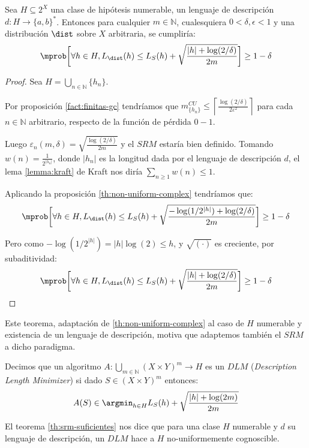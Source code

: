 \begin{fact}
 Sea $H \subseteq 2^X$ una clase de hipótesis numerable, un lenguaje de descripción $d:H \rightarrow \{a,b\}^{\ast}$. Entonces
 para cualquier $m\in \mathbb{N}$, cualesquiera $0 < \delta, \epsilon < 1$ y una distribución $\dist$ sobre $X$ arbitraria, 
 se cumpliría:
 \[
   \mprob\bigg[\forall h\in H, L_{\dist}(h) \le L_S(h) + \sqrt{\frac{|h| + \log(2/\delta)}{2m}} \bigg] \ge 1 - \delta
 \] 
 \label{fact:occam}
\end{fact}
\begin{proof}
 Sea $H = \bigcup_{n\in \mathbb{N}} \{h_n\}$. 
 
 Por proposición \ref{fact:finitas-gc} tendríamos que $m^{CU}_{\{h_n\}} \le \left\lceil \frac{\log(2/\delta)}{2\varepsilon^2} \right\rceil$
 para cada $n\in \mathbb{N}$ arbitrario, respecto de la función de pérdida $0-1$.
 
 Luego $\varepsilon_n(m,\delta) = \sqrt{\frac{\log(2/\delta)}{2m}}$ y el $SRM$ estaría bien definido. Tomando $w(n) = \frac{1}{2^{|h_n|}}$, donde
 $|h_n|$ es la longitud dada por el lenguaje de descripción $d$, el lema \ref{lemma:kraft} de Kraft nos diría 
 $\sum_{n \ge 1} w(n) \le 1$.
 
 Aplicando la proposición \ref{th:non-uniform-complex} tendríamos que:
 \[
   \mprob\bigg[\forall h\in H, L_{\dist}(h) \le L_S(h) + \sqrt{\frac{-\log(1/2^{|h|}) + \log(2/\delta)}{2m}} \bigg] \ge 1 - \delta
 \]
 
 Pero como $-\log(1/2^{|h|}) = |h|\log(2) \le h$, y $\sqrt{(\cdot)}$ es creciente, por subaditividad:
 \[
   \mprob\bigg[\forall h\in H, L_{\dist}(h) \le L_S(h) + \sqrt{\frac{|h| + \log(2/\delta)}{2m}} \bigg] \ge 1 - \delta
 \]
\end{proof}

Este teorema, adaptación de \ref{th:non-uniform-complex} al caso de $H$ numerable y existencia de un lenguaje de descripción,
motiva que adaptemos también el $SRM$ a dicho paradigma.

\begin{definition}
Decimos que un algoritmo $A: \underset{m\in \mathbb{N}}{\bigcup} (X\times Y)^m \rightarrow H$ es un $DLM$ 
(\textit{Description Length Minimizer}) si dado $S \in (X\times Y)^m$ entonces:
\[
  A(S) \in \argmin_{h\in H} L_S(h) + \sqrt{\frac{|h| + \log(2m)}{2m}} 
\]
\end{definition}

El teorema \ref{th:srm-suficientes} nos dice que para una clase $H$ numerable y $d$ su lenguaje de descripción, un $DLM$
hace a $H$ no-uniformemente cognoscible.


